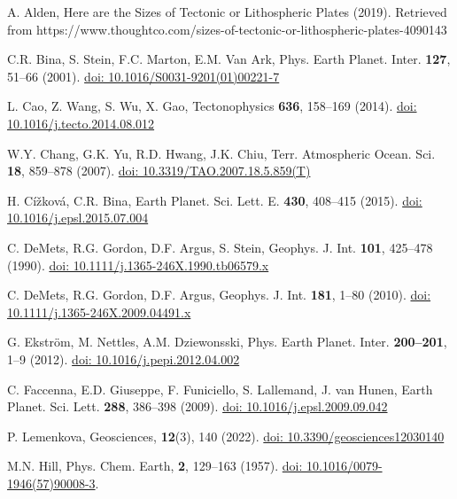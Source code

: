 \documentclass{rrparticle}
\begin{document}
\begin{thebibliography}{99}

A. Alden, Here are the Sizes of Tectonic or Lithospheric Plates (2019). Retrieved from https://www.thoughtco.com/sizes-of-tectonic-or-lithospheric-plates-4090143 

C.R. Bina, S. Stein, F.C. Marton, E.M. Van Ark, Phys. Earth Planet. Inter. \textbf{127}, 51--66 (2001). \href{https://doi.org/10.1016/S0031-9201(01)00221-7}{doi: 10.1016/S0031-9201(01)00221-7}

 L. Cao, Z. Wang, S. Wu, X. Gao, Tectonophysics \textbf{636}, 158--169 (2014). \href{https://doi.org/10.1016/j.tecto.2014.08.012}{doi: 10.1016/j.tecto.2014.08.012}

 W.Y. Chang, G.K. Yu, R.D. Hwang, J.K. Chiu, Terr. Atmospheric Ocean. Sci. \textbf{18}, 859--878 (2007). \href{https://doi.org/10.3319/TAO.2007.18.5.859(T)}{doi: 10.3319/TAO.2007.18.5.859(T)}

 H. Cížková, C.R. Bina, Earth Planet. Sci. Lett. E. \textbf{430}, 408--415 (2015). \href{https://doi.org/10.1016/j.epsl.2015.07.004}{doi: 10.1016/j.epsl.2015.07.004}

 C. DeMets, R.G. Gordon, D.F. Argus, S. Stein, Geophys. J. Int. \textbf{101}, 425--478 (1990). \href{https://doi.org/10.1111/j.1365-246X.1990.tb06579.x}{doi: 10.1111/j.1365-246X.1990.tb06579.x}

 C. DeMets, R.G. Gordon, D.F. Argus, Geophys. J. Int. \textbf{181}, 1--80 (2010). \href{https://doi.org/10.1111/j.1365-246X.2009.04491.x}{doi: 10.1111/j.1365-246X.2009.04491.x}

 G. Ekstr\"om, M. Nettles, A.M. Dziewonsski, Phys. Earth Planet. Inter. \textbf{200--201}, 1--9 (2012). \href{https://doi.org/10.1016/j.pepi.2012.04.002}{doi: 10.1016/j.pepi.2012.04.002}

 C. Faccenna, E.D. Giuseppe, F. Funiciello, S. Lallemand, J. van Hunen, Earth Planet. Sci. Lett. \textbf{288}, 386--398 (2009). \href{https://doi.org/10.1016/j.epsl.2009.09.042}{doi: 10.1016/j.epsl.2009.09.042}

P. Lemenkova, Geosciences, \textbf{12}(3), 140 (2022). \href{https://doi.org/10.3390/geosciences12030140}{doi: 10.3390/geosciences12030140}

 M.N. Hill, Phys. Chem. Earth, \textbf{2}, 129--163 (1957). \href{https://doi.org/10.1016/0079-1946(57)90008-3}{doi: 10.1016/0079-1946(57)90008-3}.


\end{thebibliography}
\end{document}
